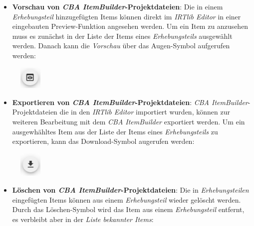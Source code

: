 \documentclass[
  letterpaper,
  DIV=11]{scrreprt}
\providecommand{\tightlist}{%
  \setlength{\itemsep}{0pt}\setlength{\parskip}{0pt}}\usepackage{longtable,booktabs,array}
\begin{document}
\begin{tcolorbox}
\begin{itemize}
\tightlist
\item
  \textbf{Vorschau von \emph{CBA ItemBuilder}-Projektdateien}: Die in
  einem \emph{Erhebungsteil} hinzugefügten Items können direkt im
  \emph{IRTlib Editor} in einer eingebauten Preview-Funktion angesehen
  werden. Um ein Item zu anzusehen muss es zunächst in der Liste der
  Items eines \emph{Erhebungsteils} ausgewählt werden. Danach kann die
  \emph{Vorschau} über das Augen-Symbol aufgerufen werden:
\end{itemize}

\begin{figure}[H]

\includegraphics[width=0.41667in,height=\textheight]{img/screenshot-preview-icon-01.png} \hfill{}

\end{figure}

\begin{itemize}
\tightlist
\item
  \textbf{Exportieren von \emph{CBA ItemBuilder}-Projektdateien}:
  \emph{CBA ItemBuilder}-Projektdateien die in den \emph{IRTlib Editor}
  importiert wurden, können zur weiteren Bearbeitung mit dem \emph{CBA
  ItemBuilder} exportiert werden. Um ein ausgewhähltes Item aus der
  Liste der Items eines \emph{Erhebungsteils} zu exportieren, kann das
  Download-Symbol augerufen werden:
\end{itemize}

\begin{figure}[H]

\includegraphics[width=0.41667in,height=\textheight]{img/screenshot-download-item-icon-01.png} \hfill{}

\end{figure}

\begin{itemize}
\tightlist
\item
  \textbf{Löschen von \emph{CBA ItemBuilder}-Projektdateien}: Die in
  \emph{Erhebungsteilen} eingefügten Items können aus einem
  \emph{Erhebungsteil} wieder gelöscht werden. Durch das Löschen-Symbol
  wird das Item aus einem \emph{Erhebungsteil} entfernt, es verbleibt
  aber in der \emph{Liste bekannter Items}:
\end{itemize}


\end{tcolorbox}
\end{document}
